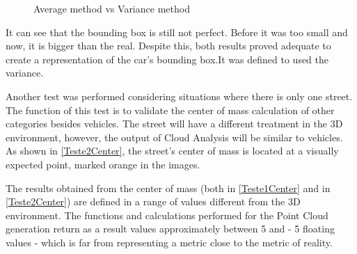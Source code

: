     \begin{figure}[H]
      \centering
        \caption{
        Average method vs Variance method}
        \qquad
        \qquad
      \label{testeColoredCloud}
    \end{figure} 
    
    It can see that the bounding box is still not perfect. Before it was too small and now, it is bigger than the real. Despite this, both results proved adequate to create a representation of the car's bounding box.It was defined to used the variance.
    
    Another test was performed considering situations where there is only one street. The function of this test is to validate the center of mass calculation of other categories besides vehicles. The street will have a different treatment in the 3D environment, however, the output of Cloud Analysis will be similar to vehicles. As shown in \autoref{Teste2Center}, the street's center of mass is located at a visually expected point, marked orange in the images.
    
    The results obtained from the center of mass (both in \autoref{Teste1Center} and in \autoref{Teste2Center}) are defined in a range of values different from the 3D environment. The functions and calculations performed for the Point Cloud generation return as a result values approximately between 5 and - 5 floating values - which is far from representing a metric close to the metric of reality.
    
